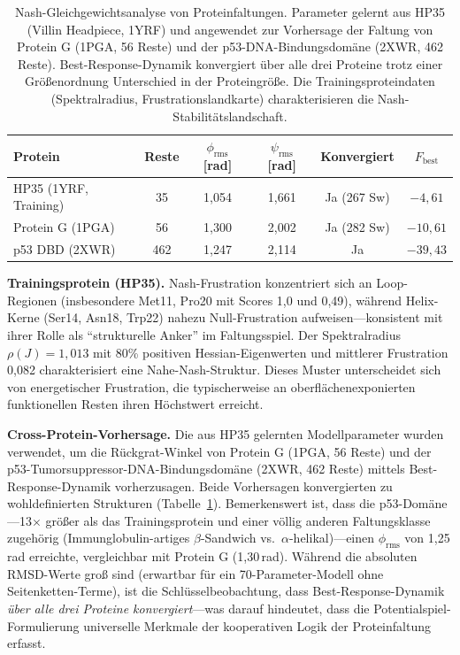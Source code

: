 \documentclass[12pt,a4paper]{article}
\theoremstyle{remark}
\begin{document}
\begin{table}[ht]
\centering
\caption{Nash-Gleichgewichtsanalyse von Proteinfaltungen. Parameter gelernt aus HP35 (Villin Headpiece, 1YRF) und angewendet zur Vorhersage der Faltung von Protein G (1PGA, 56 Reste) und der p53-DNA-Bindungsdom\"ane (2XWR, 462 Reste). Best-Response-Dynamik konvergiert \"uber alle drei Proteine trotz einer Gr\"o\ss{}enordnung Unterschied in der Proteingr\"o\ss{}e. Die Trainingsproteindaten (Spektralradius, Frustrationslandkarte) charakterisieren die Nash-Stabilit\"atslandschaft.}
\label{tab:nash-results}
\begin{tabular}{lccccc}
\toprule
\textbf{Protein} & \textbf{Reste} & $\phi_{\text{rms}}$ [rad] & $\psi_{\text{rms}}$ [rad] & \textbf{Konvergiert} & $F_{\text{best}}$ \\
\midrule
HP35 (1YRF, Training) & 35 & 1{,}054 & 1{,}661 & Ja (267 Sw) & $-4{,}61$ \\
Protein G (1PGA) & 56 & 1{,}300 & 2{,}002 & Ja (282 Sw) & $-10{,}61$ \\
p53 DBD (2XWR) & 462 & 1{,}247 & 2{,}114 & Ja & $-39{,}43$ \\
\bottomrule
\end{tabular}
\end{table}

\textbf{Trainingsprotein (HP35).} Nash-Frustration konzentriert sich an Loop-Regionen (insbesondere Met11, Pro20 mit Scores 1{,}0 und 0{,}49), w\"ahrend Helix-Kerne (Ser14, Asn18, Trp22) nahezu Null-Frustration aufweisen---konsistent mit ihrer Rolle als ``strukturelle Anker'' im Faltungsspiel. Der Spektralradius $\rho(J) = 1{,}013$ mit 80\% positiven Hessian-Eigenwerten und mittlerer Frustration 0{,}082 charakterisiert eine Nahe-Nash-Struktur. Dieses Muster unterscheidet sich von energetischer Frustration, die typischerweise an oberfl\"achenexponierten funktionellen Resten ihren H\"ochstwert erreicht.

\textbf{Cross-Protein-Vorhersage.} Die aus HP35 gelernten Modellparameter wurden verwendet, um die R\"uckgrat-Winkel von Protein G (1PGA, 56 Reste) und der p53-Tumorsuppressor-DNA-Bindungsdom\"ane (2XWR, 462 Reste) mittels Best-Response-Dynamik vorherzusagen. Beide Vorhersagen konvergierten zu wohldefinierten Strukturen (Tabelle~\ref{tab:nash-results}). Bemerkenswert ist, dass die p53-Dom\"ane---13$\times$ gr\"o\ss{}er als das Trainingsprotein und einer v\"ollig anderen Faltungsklasse zugeh\"orig (Immunglobulin-artiges $\beta$-Sandwich vs.\ $\alpha$-helikal)---einen $\phi_{\text{rms}}$ von 1{,}25\,rad erreichte, vergleichbar mit Protein G (1{,}30\,rad). W\"ahrend die absoluten RMSD-Werte gro\ss{} sind (erwartbar f\"ur ein 70-Parameter-Modell ohne Seitenketten-Terme), ist die Schl\"usselbeobachtung, dass Best-Response-Dynamik \emph{\"uber alle drei Proteine konvergiert}---was darauf hindeutet, dass die Potentialspiel-Formulierung universelle Merkmale der kooperativen Logik der Proteinfaltung erfasst.
\end{document}
